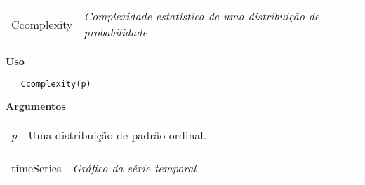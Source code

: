 \hrulefill   

\begin{table}[!ht]
\begin{center}
\begin{tabularx}{\textwidth}{ X X}
\hspace{0.5cm} Ccomplexity & \textit{Complexidade estatística de uma distribuição de probabilidade}\\
\end{tabularx}
\end{center}
\end{table} 

\vspace{-0.5cm}

\hrulefill  

\vspace{0.5cm}

\textbf{Uso}

\begin{lstlisting}
   Ccomplexity(p)
\end{lstlisting}

\vspace{0.5cm}

\textbf{Argumentos}

\begin{table}[!ht]
\begin{center}
\begin{tabularx}{\textwidth}{X X}
\hspace{0.5cm} \textit{p} & Uma distribuição de padrão ordinal.\\
\end{tabularx}
\end{center}
\end{table} 

\newpage

\hrulefill   

\begin{table}[!ht]
\begin{center}
\begin{tabularx}{\textwidth}{ X X}
\hspace{0.5cm} timeSeries & \textit{Gráfico da série temporal}\\
\end{tabularx}
\end{center}
\end{table} 

\vspace{-0.5cm}

